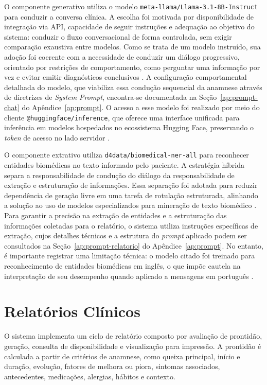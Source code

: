 O componente generativo utiliza o modelo \texttt{meta-llama/Llama-3.1-8B-Instruct} para
conduzir a conversa clínica. A escolha foi motivada por disponibilidade de integração via API,
capacidade de seguir instruções e adequação ao objetivo do sistema: conduzir o fluxo
conversacional de forma controlada, sem exigir comparação exaustiva entre modelos. Como se
trata de um modelo instruído, sua
adoção foi coerente com a necessidade de conduzir um diálogo progressivo, orientado por
restrições de comportamento, como perguntar uma informação por vez e evitar emitir diagnósticos
conclusivos \cite{llama3herd2024,metaai2024}. A configuração comportamental detalhada do modelo, 
que viabiliza essa condução sequencial da anamnese através de diretrizes de \textit{System Prompt}, 
encontra-se documentada na Seção~\ref{ap:prompt-chat} do Apêndice~\ref{ap:prompt}.
O acesso a esse modelo foi realizado por meio do cliente \texttt{@huggingface/inference}, 
que oferece uma interface unificada para inferência em modelos hospedados no ecossistema Hugging Face, 
preservando o \textit{token} de acesso no lado servidor \cite{huggingface2024}.

O componente extrativo utiliza \texttt{d4data/biomedical-ner-all} para reconhecer entidades
biomédicas no texto informado pelo paciente. A estratégia híbrida separa a responsabilidade de
condução do diálogo da responsabilidade de extração e estruturação de informações. Essa
separação foi adotada para reduzir dependência de geração livre em uma tarefa de rotulação
estruturada, alinhando a solução ao uso de modelos especializados para mineração de texto
biomédico \cite{d4data2024,lee2020}. Para garantir a precisão na extração de entidades e a 
estruturação das informações coletadas para o relatório, o sistema utiliza instruções específicas 
de extração, cujos detalhes técnicos e a estrutura do \textit{prompt} aplicado podem ser consultados 
na Seção~\ref{ap:prompt-relatorio} do Apêndice~\ref{ap:prompt}.
No entanto, é importante registrar uma limitação técnica:
o modelo citado foi treinado para reconhecimento de entidades biomédicas em inglês, o que
impõe cautela na interpretação de seu desempenho quando aplicado a mensagens em português
\cite{d4data2024}.

\section{Relatórios Clínicos}

O sistema implementa um ciclo de relatório composto por avaliação de prontidão, geração,
consulta de disponibilidade e visualização para impressão. A prontidão é calculada a partir de
critérios de anamnese, como queixa principal, início e duração, evolução, fatores de melhora ou
piora, sintomas associados, antecedentes, medicações, alergias, hábitos e contexto.

